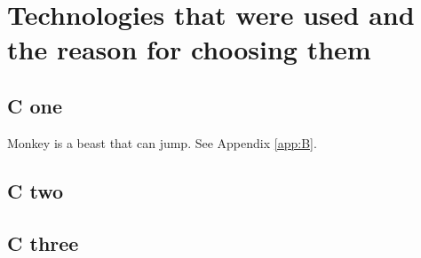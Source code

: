 \chapter{Technologies that were used and the reason for choosing them}\label{ch:C}
\section{C one}
Monkey is a beast that can jump. See Appendix \ref{app:B}.
\section{C two}
\section{C three}